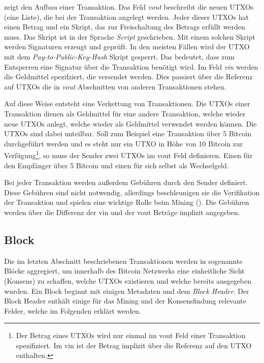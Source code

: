 \documentclass[ngerman,runningheads,a4paper]{llncs}[2018/03/10]
\begin{document}
 zeigt den Aufbau einer Transaktion. Das Feld \textit{vout} beschreibt die neuen UTXOs (eine Liste), die bei der Transaktion angelegt werden. Jeder dieser UTXOs hat einen Betrag und ein Skript, das zur Freischaltung des Betrags erfüllt werden muss. Das Skript ist in der Sprache \textit{Script} geschrieben. Mit einem solchen Skript werden Signaturen erzeugt und geprüft. In den meisten Fällen wird der UTXO mit dem \textit{Pay-to-Public-Key-Hash} \citep{bitcoinbook} Skript gesperrt. Das bedeutet, dass zum Entsperren eine Signatur über die Transaktion benötigt wird.  Im Feld \textit{vin} werden die Geldmittel spezifziert, die versendet werden. Dies passiert über die Referenz auf UTXOs die in \textit{vout} Abschnitten von anderen Transaktionen stehen.

Auf diese Weise entsteht eine Verkettung von Transaktionen. Die UTXOs einer Transaktion dienen als Geldmittel für eine andere Transaktion, welche wieder neue UTXOs anlegt, welche wieder als Geldmittel verwendet werden können. Die UTXOs sind dabei unteilbar. Soll zum Beispiel eine Transaktion über 5 Bitcoin durchgeführt werden und es steht nur ein UTXO in Höhe von 10 Bitcoin zur Verfügung\footnote{Der Betrag eines UTXOs wird nur einmal im vout Feld einer Transaktion spezifiziert. Im vin ist der Betrag implizit über die Referenz auf den UTXO enthalten.}, so muss der Sender zwei UTXOs im vout Feld definieren. Einen für den Empfänger über 5 Bitcoin und einen für sich selbst als Wechselgeld.

Bei jeder Transaktion werden außerdem Gebühren durch den Sender definiert. Diese Gebühren sind nicht notwendig, allerdings beschleunigen sie die Verifikation der Transaktion und spielen eine wichtige Rolle beim Mining (). Die Gebühren werden über die Differenz der vin und der vout Beträge implizit angegeben.

\subsection{Block}\label{sec:block}

Die im letzten Abschnitt beschriebenen Transaktionen werden in sogenannte Blöcke aggregiert, um innerhalb des Bitcoin Netzwerks eine einheitliche Sicht (Konsens) zu schaffen, welche UTXOs existieren und welche bereits ausgegeben wurden. Ein Block beginnt mit einigen Metadaten und dem \textit{Block Header}. Der Block Header enthält einige für das Mining und der Konsensfindung relevante Felder, welche im Folgenden erklärt werden.
\end{document}
